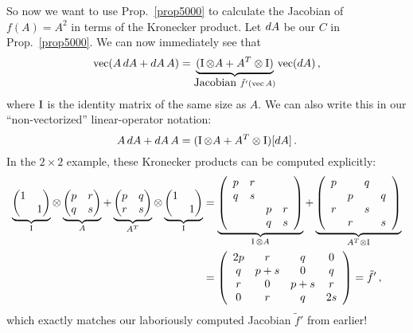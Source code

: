 So now we want to use Prop.~\ref{prop5000} to calculate the
Jacobian of $f(A)=A^{2}$ in terms of the Kronecker product. Let $d A$
be our $C$ in Prop.~\ref{prop5000}. We can now immediately see that
\[
\operatorname{vec}(A\,dA+d A\,A)=\underbrace{(\operatorname{I}\otimes A+A^{T}\otimes\operatorname{I})}_{\mbox{Jacobian }\tilde{f}'(\operatorname{vec} A)}\operatorname{vec}(d A) \, ,
\]
where $\operatorname{I}$ is the identity matrix of the same size as $A$. We can
also write this in our ``non-vectorized'' linear-operator notation:
\[
A\,d A+d A\,A=(\operatorname{I}\otimes A+A^{T}\otimes\operatorname{I})[d A] \, .
\]
In the $2\times2$ example, these Kronecker products can be computed
explicitly: 
\begin{align*}
\underbrace{\begin{pmatrix}1 & \\
 & 1
\end{pmatrix}}_{\operatorname{I}}\otimes\underbrace{\begin{pmatrix}p & r\\
q & s
\end{pmatrix}}_{A}+\underbrace{\begin{pmatrix}p & q\\
r & s
\end{pmatrix}}_{A^{T}}\otimes\underbrace{\begin{pmatrix}1 & \\
 & 1
\end{pmatrix}}_{\operatorname{I}} & =\underbrace{\left(\begin{array}{cccc}
p & r &  & \\
q & s &  & \\
 &  & p & r\\
 &  & q & s
\end{array}\right)}_{\operatorname{I}\otimes A}+\underbrace{\left(\begin{array}{cccc}
p &  & q & \\
 & p &  & q\\
r &  & s & \\
 & r &  & s
\end{array}\right)}_{A^{T}\otimes\operatorname{I}}\\
 & =\left(\begin{array}{cccc}
2p & r & q & 0\\
q & p+s & 0 & q\\
r & 0 & p+s & r\\
0 & r & q & 2s
\end{array}\right)=\tilde{f}'\,,
\end{align*}
which exactly matches our laboriously computed Jacobian $\tilde{f}'$
from earlier!

